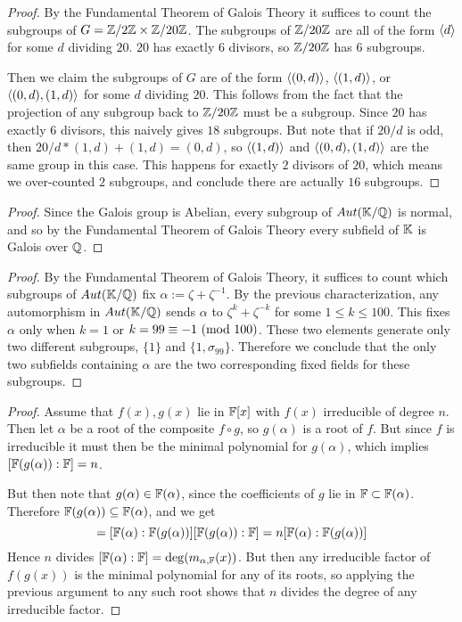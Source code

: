 \documentclass[11pt]{article}
\begin{document}
\begin{proof}
  By the Fundamental Theorem of Galois Theory it suffices to count the subgroups of $G = \mathbb{Z}/2\mathbb{Z} \times \mathbb{Z}/20\mathbb{Z}$.
  The subgroups of $\mathbb{Z}/20\mathbb{Z}$ are all of the form $\langle d \rangle$ for some $d$ dividing $20$.
  $20$ has exactly $6$ divisors, so $\mathbb{Z}/20\mathbb{Z}$ has $6$ subgroups.

  Then we claim the subgroups of $G$ are of the form $\langle (0,d) \rangle$, $\langle (1,d) \rangle$, or $\langle (0,d),(1,d) \rangle$ for some $d$ dividing $20$.
  This follows from the fact that the projection of any subgroup back to $\mathbb{Z}/20\mathbb{Z}$ must be a subgroup.
  Since $20$ has exactly $6$ divisors, this naively gives $18$ subgroups.
  But note that if $20/d$ is odd, then $20/d*(1,d) + (1,d) = (0,d)$, so $\langle (1,d) \rangle$ and $\langle (0,d),(1,d) \rangle$ are the same group in this case.
  This happens for exactly $2$ divisors of $20$, which means we over-counted $2$ subgroups, and conclude there are actually $16$ subgroups.
\end{proof}

\begin{proof}
  Since the Galois group is Abelian, every subgroup of $Aut(\mathbb{K}/\mathbb{Q})$ is normal, and so by the Fundamental Theorem of Galois Theory every subfield of $\mathbb{K}$ is Galois over $\mathbb{Q}$.
\end{proof}

\begin{proof}
  By the Fundamental Theorem of Galois Theory, it suffices to count which subgroups of $Aut(\mathbb{K}/\mathbb{Q})$ fix $\alpha := \zeta + \zeta^{-1}$.
  By the previous characterization, any automorphism in $Aut(\mathbb{K}/\mathbb{Q})$ sends $\alpha$ to $\zeta^k + \zeta^{-k}$ for some $1 \le k \le 100$.
  This fixes $\alpha$ only when $k = 1$ or $k = 99 \equiv -1\ (\text{mod}\ 100)$.
  These two elements generate only two different subgroups, $\{1\}$ and $\{1,\sigma_{99}\}$.
  Therefore we conclude that the only two subfields containing $\alpha$ are the two corresponding fixed fields for these subgroups.
\end{proof}


\begin{proof}
  Assume that $f(x),g(x)$ lie in $\mathbb{F}[x]$ with $f(x)$ irreducible of degree $n$.
  Then let $\alpha$ be a root of the composite $f \circ g$, so $g(\alpha)$ is a root of $f$.
  But since $f$ is irreducible it must then be the minimal polynomial for $g(\alpha)$, which implies $[\mathbb{F}(g(\alpha)) : \mathbb{F}] = n$.

  But then note that $g(\alpha) \in \mathbb{F}(\alpha)$, since the coefficients of $g$ lie in $\mathbb{F} \subset \mathbb{F}(\alpha)$.
  Therefore $\mathbb{F}(g(\alpha)) \subseteq \mathbb{F}(\alpha)$, and we get
  \begin{equation*}
    [\F(\alpha) : \F] = [\F(\alpha) : \F(g(\alpha))][\F(g(\alpha)) : \F] = n[\F(\alpha) : \F(g(\alpha))]
  \end{equation*}
  Hence $n$ divides $[\mathbb{F}(\alpha) : \mathbb{F}] = \deg(m_{\alpha, \mathbb{F}}(x))$.
  But then any irreducible factor of $f(g(x))$ is the minimal polynomial for any of its roots, so applying the previous argument to any such root shows that $n$ divides the degree of any irreducible factor.
\end{proof}
\end{document}
